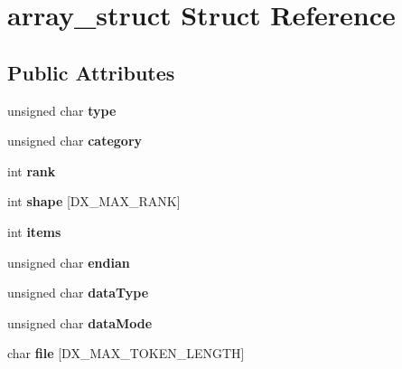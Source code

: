 \hypertarget{structarray__struct}{
\section{array\_\-struct Struct Reference}
\label{structarray__struct}
}
\subsection*{Public Attributes}
\begin{DoxyCompactItemize}
\item 
\hypertarget{structarray__struct_a29852cf92b15409e1f7b7f38da9b2778}{
unsigned char {\bfseries type}}
\label{structarray__struct_a29852cf92b15409e1f7b7f38da9b2778}

\item 
\hypertarget{structarray__struct_a7d0872d5efc8e82afe638f1b3813f4af}{
unsigned char {\bfseries category}}
\label{structarray__struct_a7d0872d5efc8e82afe638f1b3813f4af}

\item 
\hypertarget{structarray__struct_abb4cbf028381684f166928070091acd1}{
int {\bfseries rank}}
\label{structarray__struct_abb4cbf028381684f166928070091acd1}

\item 
\hypertarget{structarray__struct_a6e34f66b59bdbebbe426e7c982034072}{
int {\bfseries shape} \mbox{[}DX\_\-MAX\_\-RANK\mbox{]}}
\label{structarray__struct_a6e34f66b59bdbebbe426e7c982034072}

\item 
\hypertarget{structarray__struct_af17eecd07f3b47b4d3f6757df11c573a}{
int {\bfseries items}}
\label{structarray__struct_af17eecd07f3b47b4d3f6757df11c573a}

\item 
\hypertarget{structarray__struct_aa19804ce4c0d515a52e549c2bdf3de36}{
unsigned char {\bfseries endian}}
\label{structarray__struct_aa19804ce4c0d515a52e549c2bdf3de36}

\item 
\hypertarget{structarray__struct_a064651b7fad8a3f39d75ec59530b57a8}{
unsigned char {\bfseries dataType}}
\label{structarray__struct_a064651b7fad8a3f39d75ec59530b57a8}

\item 
\hypertarget{structarray__struct_ae2ecad36ebc20976ffdc551eb724466b}{
unsigned char {\bfseries dataMode}}
\label{structarray__struct_ae2ecad36ebc20976ffdc551eb724466b}

\item 
\hypertarget{structarray__struct_a90b5af83151861d5e3107562785e083b}{
char {\bfseries file} \mbox{[}DX\_\-MAX\_\-TOKEN\_\-LENGTH\mbox{]}}
\label{structarray__struct_a90b5af83151861d5e3107562785e083b}


\end{DoxyCompactItemize}
